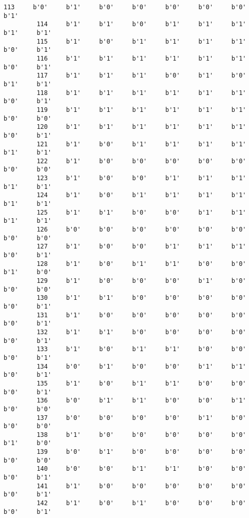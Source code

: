 \documentclass[11pt]{article}
\begin{document}
\begin{Verbatim}[commandchars=\\\{\}]
         113     b'0'     b'1'     b'0'     b'0'     b'0'     b'0'     b'0'     b'1'   
         114     b'1'     b'1'     b'0'     b'1'     b'1'     b'1'     b'1'     b'1'   
         115     b'1'     b'0'     b'1'     b'1'     b'1'     b'1'     b'0'     b'1'   
         116     b'1'     b'1'     b'1'     b'1'     b'1'     b'1'     b'0'     b'1'   
         117     b'1'     b'1'     b'1'     b'0'     b'1'     b'0'     b'1'     b'1'   
         118     b'1'     b'1'     b'1'     b'1'     b'1'     b'1'     b'0'     b'1'   
         119     b'1'     b'1'     b'1'     b'1'     b'1'     b'1'     b'0'     b'0'   
         120     b'1'     b'1'     b'1'     b'1'     b'1'     b'1'     b'0'     b'1'   
         121     b'1'     b'0'     b'1'     b'1'     b'1'     b'1'     b'1'     b'1'   
         122     b'1'     b'0'     b'0'     b'0'     b'0'     b'0'     b'0'     b'0'   
         123     b'1'     b'0'     b'0'     b'1'     b'1'     b'1'     b'1'     b'1'   
         124     b'1'     b'0'     b'1'     b'1'     b'1'     b'1'     b'1'     b'1'   
         125     b'1'     b'1'     b'0'     b'0'     b'1'     b'1'     b'1'     b'1'   
         126     b'0'     b'0'     b'0'     b'0'     b'0'     b'0'     b'0'     b'0'   
         127     b'1'     b'0'     b'0'     b'1'     b'1'     b'1'     b'0'     b'1'   
         128     b'1'     b'0'     b'1'     b'1'     b'0'     b'0'     b'1'     b'0'   
         129     b'1'     b'0'     b'0'     b'0'     b'1'     b'0'     b'0'     b'0'   
         130     b'1'     b'1'     b'0'     b'0'     b'0'     b'0'     b'0'     b'1'   
         131     b'1'     b'0'     b'0'     b'0'     b'0'     b'0'     b'0'     b'1'   
         132     b'1'     b'1'     b'0'     b'0'     b'0'     b'0'     b'0'     b'1'   
         133     b'1'     b'0'     b'1'     b'1'     b'0'     b'0'     b'0'     b'1'   
         134     b'0'     b'1'     b'0'     b'0'     b'1'     b'1'     b'0'     b'1'   
         135     b'1'     b'0'     b'1'     b'1'     b'0'     b'0'     b'0'     b'1'   
         136     b'0'     b'1'     b'1'     b'0'     b'0'     b'1'     b'0'     b'0'   
         137     b'0'     b'0'     b'0'     b'0'     b'1'     b'0'     b'0'     b'0'   
         138     b'1'     b'0'     b'0'     b'0'     b'0'     b'0'     b'1'     b'0'   
         139     b'0'     b'1'     b'0'     b'0'     b'0'     b'0'     b'0'     b'0'   
         140     b'0'     b'0'     b'1'     b'1'     b'0'     b'0'     b'0'     b'1'   
         141     b'1'     b'0'     b'0'     b'0'     b'0'     b'0'     b'0'     b'1'   
         142     b'1'     b'0'     b'1'     b'0'     b'0'     b'0'     b'0'     b'1'   

\end{Verbatim}
\end{document}
